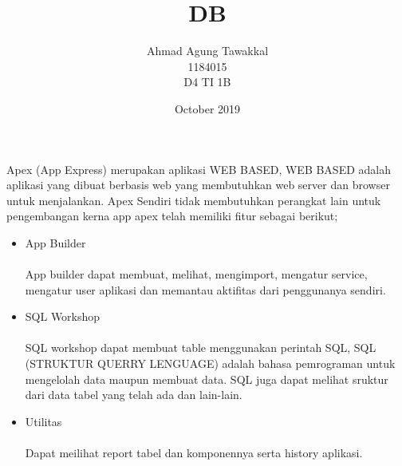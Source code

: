 \documentclass{article}
\title{DB}
\author{Ahmad Agung Tawakkal\\1184015\\D4 TI 1B}
\date{October 2019}
\begin{document}
\maketitle

\newpage

\paragraph{}Apex (App Express) merupakan aplikasi WEB BASED, WEB BASED adalah aplikasi yang dibuat berbasis web yang membutuhkan web server dan browser untuk menjalankan. Apex Sendiri tidak membutuhkan perangkat lain untuk pengembangan kerna app apex telah memiliki fitur sebagai berikut;
    \begin{itemize}
        \item App Builder 
            \paragraph{}App builder dapat membuat, melihat, mengimport, mengatur service, mengatur user aplikasi dan memantau aktifitas dari penggunanya sendiri.
        \item SQL Workshop
            \paragraph{}SQL workshop dapat membuat table menggunakan perintah SQL, SQL (STRUKTUR QUERRY LENGUAGE) adalah bahasa pemrograman untuk mengelolah data maupun membuat data. SQL juga dapat melihat sruktur dari data tabel yang telah ada dan lain-lain.
        \item Utilitas 
            \paragraph{}Dapat meilihat report tabel dan komponennya serta history aplikasi.
    \end{itemize}
    
\end{document}
